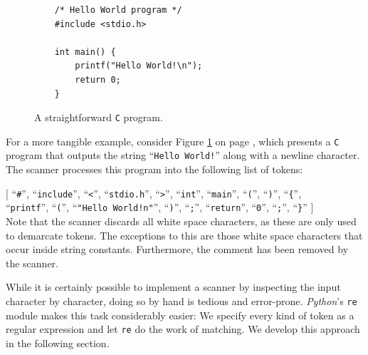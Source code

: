 \begin{figure}[!ht]
\centering
\begin{verbatim}
    /* Hello World program */
    #include <stdio.h>
    
    int main() {
        printf("Hello World!\n");
        return 0;
    }
\end{verbatim}
\vspace*{-0.3cm}
\caption{A straightforward \texttt{C} program.}
\label{fig:hello-world.c}
\end{figure}

\noindent
For a more tangible example, consider Figure \ref{fig:hello-world.c} on page \pageref{fig:hello-world.c}, which
presents a \texttt{C} program that outputs the string ``\texttt{Hello World!}'' along with a newline
character. The scanner processes this program into the following list of tokens:

\noindent
\hspace*{1.3cm}
   [ ``\texttt{\#}'', ``\texttt{include}'', ``\texttt{<}'', ``\texttt{stdio.h}'', ``\texttt{>}'',
   ``\texttt{int}'', ``\texttt{main}'', ``\texttt{(}'', ``\texttt{)}'', ``\texttt{\{}'',
\\
\hspace*{1.4cm} 
     ``\texttt{printf}'', ``\texttt{(}'', ``\texttt{"Hello World!n"}'', ``\texttt{)}'', ``\texttt{;}'', ``\texttt{return}'', ``\texttt{0}'', ``\texttt{;}'', ``\texttt{\}}''
   ]
   \\[0.2cm]
Note that the scanner discards all white space characters, as these are only used to demarcate tokens.  The
exceptions to this are those white space characters that occur inside string constants.  Furthermore, the
comment has been removed by the scanner. 

While it is certainly possible to implement a scanner by inspecting the input character by character, doing so
by hand is tedious and error-prone.  \textsl{Python}'s \texttt{re} module makes this task considerably easier:
We specify every kind of token as a regular expression and let \texttt{re} do the work of matching.  We develop
this approach in the following section.

